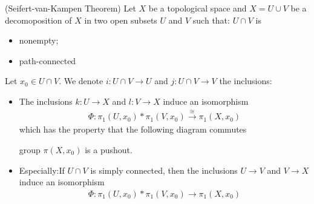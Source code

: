 \documentclass[Total.tex]{subfiles}
\begin{document}
			\begin{theorem}
				(Seifert-van-Kampen Theorem) Let $X$ be a topological space and $X=U\cup V$ be a decomoposition of $X$ in two open subsets $U$ and $V$ such that: $U\cap V$ is 
				\begin{itemize}
					\item nonempty;
					\item path-connected
				\end{itemize}
				Let $x_0\in U\cap V$. We denote $i:U\cap V\rightarrow U$ and $j:U\cap V\rightarrow V$ the inclusions:
				\begin{itemize}
					\item The inclusions $k:U\rightarrow X$ and $l:V\rightarrow X$ induce an isomorphism
					\begin{gather*}
						\Phi:\pi_1(U,x_0)*\pi_1(V,x_0)\stackrel{\cong}{\rightarrow} \pi_1(X,x_0)
					\end{gather*}
					which has the property that the following diagram commutes
					\begin{center}
					\end{center}
					group $\pi(X,x_0)$ is a pushout.
					\item Especially:If $U\cap V$ is simply connected, then the inclusions $U\rightarrow V$ and $V\rightarrow X$ induce an isomorphism
					\begin{gather*}
						\Phi:\pi_1(U,x_0)*\pi_1(V,x_0)\rightarrow \pi_1(X,x_0)
					\end{gather*}
				\end{itemize}
			\end{theorem}
\end{document}
